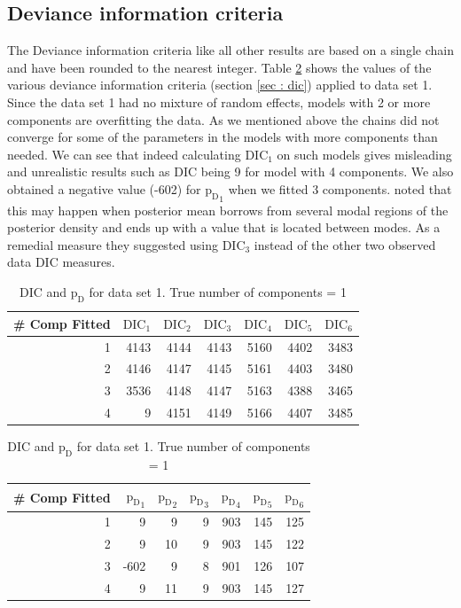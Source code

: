 \subsection{Deviance information criteria}
\label{subsec : dic_simulation_results}
The Deviance information criteria like all other results are based on a single chain and have been rounded to the nearest integer. Table \ref{table : ds_simple_dic} shows the values of the various deviance information criteria (section \ref{sec : dic}) applied to data set 1. Since the data set 1 had no mixture of random effects, models with 2 or more components are overfitting the data. As we mentioned above the chains did not converge for some of the parameters in the models with more components than needed. We can see that indeed calculating $\text{DIC}_1$ on such models gives misleading and unrealistic results such as DIC being 9 for model with 4 components. We also obtained a negative value (-602) for ${\text{p}_\text{D}}_1$ when we fitted 3 components. \citet{celeux_deviance_2006} noted that this may happen when posterior mean borrows from several modal regions of the posterior density and ends up with a value that is located between modes. As a remedial measure they suggested using $\text{DIC}_3$ instead of the other two observed data DIC measures.\\

\begin{table}[!htb]
\centering
\captionsetup{justification=centering}
\caption{DIC and $\text{p}_\text{D}$ for data set 1. True number of components = 1}
\label{table : ds_simple_dic} 
\begin{tabular}{@{}rrrrrrr@{}}
\toprule
\# Comp Fitted & $\text{DIC}_1$ & $\text{DIC}_2$  & $\text{DIC}_3$  & $\text{DIC}_4$  & $\text{DIC}_5$  & $\text{DIC}_6$  \\ \midrule
1      & 4143 & 4144 & 4143 & 5160 & 4402 & 3483 \\
2      & 4146 & 4147 & 4145 & 5161 & 4403 & 3480 \\
3      & 3536 & 4148 & 4147 & 5163 & 4388 & 3465 \\
4      & 9    & 4151 & 4149 & 5166 & 4407 & 3485 \\ \bottomrule
\end{tabular}

\begin{tabular}{@{}rrrrrrr@{}}
\toprule
\# Comp Fitted & ${\text{p}_\text{D}}_1$ & ${\text{p}_\text{D}}_2$ & ${\text{p}_\text{D}}_3$ & ${\text{p}_\text{D}}_4$ & ${\text{p}_\text{D}}_5$ & ${\text{p}_\text{D}}_6$ \\ \midrule
1      & 9    & 9    & 9    & 903  & 145  & 125  \\
2      & 9    & 10   & 9    & 903  & 145  & 122  \\
3      & -602 & 9    & 8    & 901  & 126  & 107  \\
4      & 9    & 11   & 9    & 903  & 145  & 127  \\ \bottomrule
\end{tabular}
\end{table}

